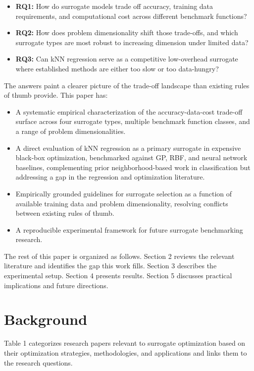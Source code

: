 \documentclass[sigconf,nonacm]{acmart}
\begin{document}
\begin{itemize}
\item \textbf{RQ1:} How do surrogate models trade off accuracy, training data requirements, and computational cost across different benchmark functions?
\item \textbf{RQ2:} How does problem dimensionality shift those trade-offs, and which surrogate types are most robust to increasing dimension under limited data?
\item \textbf{RQ3:} Can kNN regression serve as a competitive low-overhead surrogate where established methods are either too slow or too data-hungry?
\end{itemize}

The answers paint a clearer picture of the trade-off landscape than existing rules of thumb provide. This paper has:

\begin{itemize}
    \item A systematic empirical characterization of the accuracy-data-cost trade-off surface across four surrogate types, multiple benchmark function classes, and a range of problem dimensionalities.
    \item A direct evaluation of kNN regression as a primary surrogate in expensive black-box optimization, benchmarked against GP, RBF, and neural network baselines, complementing prior neighborhood-based work in classification but addressing a gap in the regression and optimization literature.
    \item Empirically grounded guidelines for surrogate selection as a function of available training data and problem dimensionality, resolving conflicts between existing rules of thumb.
    \item A reproducible experimental framework for future surrogate benchmarking research. 
\end{itemize}

The rest of this paper is organized as follows. Section 2 reviews the relevant literature and identifies the gap this work fills. Section 3 describes the experimental setup. Section 4 presents results. Section 5 discusses practical implications and future directions.

\section{Background}

Table 1 categorizes research papers relevant to surrogate optimization based on their optimization strategies, methodologies, and applications and links them to the research questions.
\end{document}
